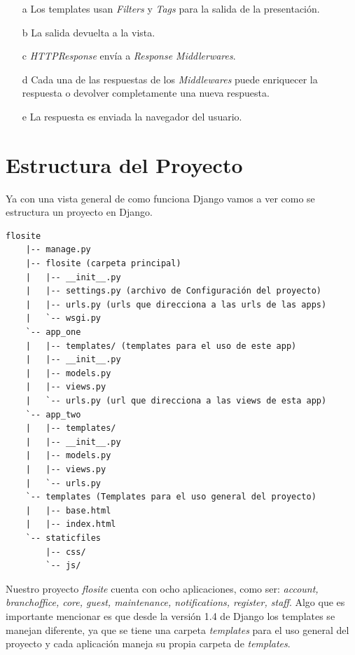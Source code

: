 \begin{itemize}
  \item[a] Los templates usan {\it Filters} y {\it Tags} para la salida de la presentación.
  \item[b] La salida devuelta a la vista.
  \item[c] {\it HTTPResponse} envía a {\it Response Middlerwares}.
  \item[d] Cada una de las respuestas de los {\it Middlewares} puede enriquecer
    la respuesta o devolver completamente una nueva respuesta.
  \item[e] La respuesta es enviada la navegador del usuario.
\end{itemize}

\section{Estructura del Proyecto}
Ya con una vista general de como funciona Django vamos a ver como se estructura
un proyecto en Django.

\begin{verbatim}
flosite
    |-- manage.py
    |-- flosite (carpeta principal)
    |   |-- __init__.py
    |   |-- settings.py (archivo de Configuración del proyecto)
    |   |-- urls.py (urls que direcciona a las urls de las apps)
    |   `-- wsgi.py
    `-- app_one
    |   |-- templates/ (templates para el uso de este app)
    |   |-- __init__.py
    |   |-- models.py
    |   |-- views.py
    |   `-- urls.py (url que direcciona a las views de esta app)
    `-- app_two
    |   |-- templates/
    |   |-- __init__.py
    |   |-- models.py
    |   |-- views.py
    |   `-- urls.py
    `-- templates (Templates para el uso general del proyecto)
    |   |-- base.html
    |   |-- index.html
    `-- staticfiles
        |-- css/
        `-- js/

\end{verbatim}

Nuestro proyecto {\it flosite} cuenta con ocho aplicaciones, como ser: {\it account,
branchoffice, core, guest, maintenance, notifications, register, staff}. Algo
que es importante mencionar es que desde la versión 1.4 de Django los templates
se manejan diferente, ya que se tiene una carpeta {\it templates} para el uso
general del proyecto y cada aplicación maneja su propia carpeta de {\it templates}.

